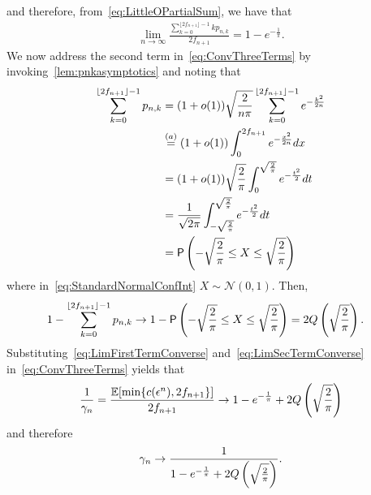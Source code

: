     and therefore, from~\cref{eq:LittleOPartialSum}, we have that 
    \begin{align}\label{eq:LimFirstTermConverse}
        \lim_{n \to \infty}  \frac{\sum_{k=0}^{\lfloor 2f_{n+1} \rfloor-1} k p_{n,k}}{2f_{n+1}}  = 1-e^{-\frac{1}{\pi}}.
    \end{align}
    We now address the second term in~\cref{eq:ConvThreeTerms} by invoking~\cref{lem:pnkasymptotics} and noting that 
    \begin{align}
       \sum_{k=0}^{\lfloor 2f_{n+1} \rfloor-1} p_{n,k} &= (1+o(1)) \sqrt{\frac{2}{n \pi}}\sum_{k=0}^{\lfloor 2f_{n+1} \rfloor-1} e^{-\frac{k^2}{2n}} \nonumber\\
       &\stackrel{(a)}{=} (1+o(1)) \int_{0}^{2f_{n+1}} e^{-\frac{x^2}{2n}} dx \nonumber\\
       &= (1+o(1)) \sqrt{\frac{2}{\pi}} \int_{0}^{\sqrt{\frac{2}{\pi}}} e^{-\frac{t^2}{2}} dt \nonumber\\
       &= \frac{1}{\sqrt{2\pi}} \int_{-\sqrt{\frac{2}{\pi}}}^{\sqrt{\frac{2}{\pi}}} e^{-\frac{t^2}{2}} dt \nonumber \\
        &= \mathsf{P}\left(-\sqrt{\frac{2}{\pi}} \le X \le \sqrt{\frac{2}{\pi}}\right) \label{eq:StandardNormalConfInt}
    \end{align}
    where in~\cref{eq:StandardNormalConfInt} $X \sim \mathcal{N}(0,1)$. Then, 
    \begin{align}
        1- \sum_{k=0}^{\lfloor 2f_{n+1} \rfloor-1} p_{n,k}  &\to 1-\mathsf{P}\left(-\sqrt{\frac{2}{\pi}} \le X \le \sqrt{\frac{2}{\pi}}\right) = 2Q\left(\sqrt{\frac{2}{\pi}}\right) \label{eq:LimSecTermConverse}. 
    \end{align}
    Substituting~\cref{eq:LimFirstTermConverse} and~\cref{eq:LimSecTermConverse} in~\cref{eq:ConvThreeTerms} yields that 
    \begin{align}
     \frac{1}{\gamma_n} = \frac{\operatorname{\mathbb{E}}[\min\{c(\epsilon^n), 2f_{n+1}\}]}{2f_{n+1}} \to 1-e^{-\frac{1}{\pi}} + 2Q\left(\sqrt{\frac{2}{\pi}}\right)
    \end{align}
    and therefore 
    \begin{align}\label{eq:finalGammaLimit}
        \gamma_n \to \frac{1}{1-e^{-\frac{1}{\pi}} + 2Q\left(\sqrt{\frac{2}{\pi}}\right)}. 
    \end{align}


